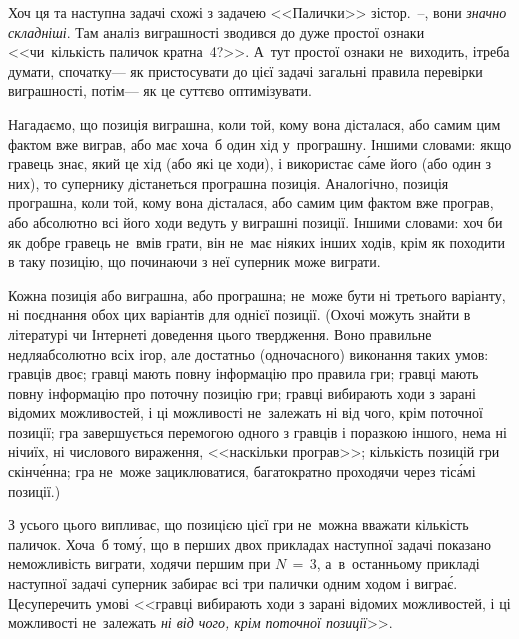\Tutorial %
Хоч ця та наступна задачі схожі з задачею <<Палички>> зі\nolinebreak[2] стор.~\mbox{\pageref{text:sticks-simple-begin}--\pageref{text:sticks-simple-end}}, вони \emph{значно складніші}. Там аналіз виграшності зводився до дуже простої ознаки <<чи~кількість паличок кратна~4?>>. А~тут простої ознаки не~виходить, і\nolinebreak[2] треба думати, спочатку\nolinebreak[3] --- як пристосувати до цієї задачі загальні правила перевірки виграшності, потім\nolinebreak[3] --- як це суттєво оптимізувати.

Нагадаємо, що позиція виграшна, коли той, кому вона дісталася, або самим цим фактом вже виграв, або має хоча~б один хід у~програшну. 
Іншими словами: 
якщо гравець знає, який це хід (або які це ходи), і використає с\'{а}ме його (або один з них), то супернику дістанеться програшна позиція. Аналогічно, позиція програшна, коли той, кому вона дісталася, або самим цим фактом вже програв, або абсолютно всі його ходи ведуть у виграшні позиції. 
Іншими словами: 
хоч би як добре гравець не~вмів грати, він не~має ніяких інших ходів, крім як походити в таку позицію, що починаючи з неї суперник може виграти. 


Кожна позиція або виграшна, або програшна; не~може бути ні третього варіанту, ні поєднання обох цих варіантів для однієї позиції. (Охочі можуть знайти в літературі чи Інтернеті доведення цього твердження. Воно правильне не\nolinebreak[3] для\nolinebreak[3] абсолютно всіх ігор, але достатньо (одночасного) виконання таких умов: гравців двоє; гравці мають повну інформацію про правила гри; гравці мають повну інформацію про поточну позицію гри; гравці вибирають ходи з зарані відомих можливостей, і ці можливості не~залежать ні від чого, крім поточної позиції; гра завершується перемогою одного з гравців і поразкою іншого, нема ні нічиїх, ні числового вираження, <<наскільки програв>>; кількість позицій гри скінч\'{е}нна; гра не~може зациклюватися, багатократно проходячи через ті\nolinebreak[3] с\'{а}мі позиції.)

З усього цього випливає, що позицією цієї гри не~можна вважати %
кількість паличок. Хоча~б том\'{у}, що в перших двох прикладах наступної задачі показано неможливість виграти, ходячи першим при ${N\,{=}\,3}$, а~в~останньому прикладі наступної задачі суперник забирає всі три палички одним ходом і вигра\'{є}. 
Це\nolinebreak[3] суперечить умові <<гравці вибирають ходи з зарані відомих можливостей, і ці можливості не~залежать \emph{ні від чого, крім поточної позиції}>>. 

